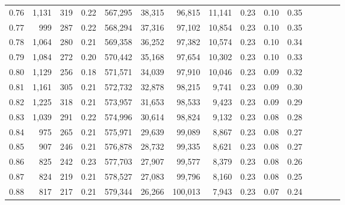 \begin{tabular}{rrrcrrrrrrrrrrr}
0.76 &   1,131 &    319 &                                       0.22 &  567,295 &   38,315 &   96,815 &   11,141 &  0.23 &  0.10 &                         0.35 \\
0.77 &     999 &    287 &                                       0.22 &  568,294 &   37,316 &   97,102 &   10,854 &  0.23 &  0.10 &                         0.35 \\
0.78 &   1,064 &    280 &                                       0.21 &  569,358 &   36,252 &   97,382 &   10,574 &  0.23 &  0.10 &                         0.34 \\
0.79 &   1,084 &    272 &                                       0.20 &  570,442 &   35,168 &   97,654 &   10,302 &  0.23 &  0.10 &                         0.33 \\
0.80 &   1,129 &    256 &                                       0.18 &  571,571 &   34,039 &   97,910 &   10,046 &  0.23 &  0.09 &                         0.32 \\
0.81 &   1,161 &    305 &                                       0.21 &  572,732 &   32,878 &   98,215 &    9,741 &  0.23 &  0.09 &                         0.30 \\
0.82 &   1,225 &    318 &                                       0.21 &  573,957 &   31,653 &   98,533 &    9,423 &  0.23 &  0.09 &                         0.29 \\
0.83 &   1,039 &    291 &                                       0.22 &  574,996 &   30,614 &   98,824 &    9,132 &  0.23 &  0.08 &                         0.28 \\
0.84 &     975 &    265 &                                       0.21 &  575,971 &   29,639 &   99,089 &    8,867 &  0.23 &  0.08 &                         0.27 \\
0.85 &     907 &    246 &                                       0.21 &  576,878 &   28,732 &   99,335 &    8,621 &  0.23 &  0.08 &                         0.27 \\
0.86 &     825 &    242 &                                       0.23 &  577,703 &   27,907 &   99,577 &    8,379 &  0.23 &  0.08 &                         0.26 \\
0.87 &     824 &    219 &                                       0.21 &  578,527 &   27,083 &   99,796 &    8,160 &  0.23 &  0.08 &                         0.25 \\
0.88 &     817 &    217 &                                       0.21 &  579,344 &   26,266 &  100,013 &    7,943 &  0.23 &  0.07 &                         0.24 \\

\end{tabular}
